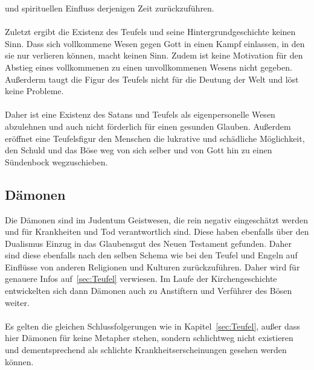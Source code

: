 und spirituellen Einfluss derjenigen Zeit zurückzuführen.
\\~\\
Zuletzt ergibt die Existenz des Teufels und seine Hintergrundgeschichte keinen Sinn. Dass sich vollkommene Wesen gegen Gott in einen Kampf einlassen, in den 
sie nur verlieren können, macht keinen Sinn. Zudem ist keine Motivation für den Abstieg eines vollkommenen zu einen unvollkommenen Wesens nicht gegeben.
Außerderm taugt die Figur des Teufels nicht für die Deutung der Welt und löst keine Probleme.
\\~\\
Daher ist eine Existenz des Satans und Teufels als eigenpersonelle Wesen abzulehnen und auch nicht förderlich für einen gesunden Glauben. Außerdem eröffnet 
eine Teufelsfigur den Menschen die lukrative und schädliche Möglichkeit, den Schuld und das Böse weg von sich selber und von Gott hin zu einen Sündenbock wegzuschieben.

\subsection{Dämonen}
Die Dämonen sind im Judentum Geistwesen, die rein negativ eingeschätzt werden und für Krankheiten und Tod verantwortlich sind. Diese haben ebenfalls 
über den Dualismus Einzug in das Glaubensgut des Neuen Testament gefunden. Daher sind diese ebenfalls nach den selben Schema wie bei den Teufel und 
Engeln auf Einflüsse von anderen Religionen und Kulturen zurückzuführen. Daher wird für genauere Infos auf\ \ref{sec:Teufel} verwiesen. Im Laufe der 
Kirchengeschichte entwickelten sich dann Dämonen auch zu Anstiftern und Verführer des Bösen weiter.
\\~\\
Es gelten die gleichen Schlussfolgerungen wie in Kapitel\ \ref{sec:Teufel}, außer dass hier Dämonen für keine Metapher stehen, sondern schlichtweg nicht 
existieren und dementsprechend als schlichte Krankheitserscheinungen gesehen werden können.

